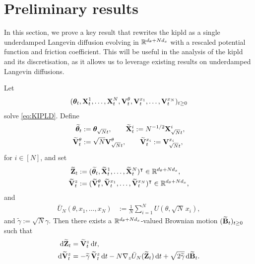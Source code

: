 \section{Preliminary results}

\setcounter{theorem}{0}
\renewcommand{\thetheorem}{A.\arabic{theorem}}
\setcounter{lemma}{0}
\renewcommand{\thelemma}{A.\arabic{lemma}}
\setcounter{proposition}{0}
\renewcommand{\theproposition}{A.\arabic{proposition}}
\setcounter{remark}{0}
\renewcommand{\theremark}{A.\arabic{remark}}

In this section, we prove a key result that rewrites the \gls*{kipld} as a single underdamped Langevin diffusion evolving in ${\mathbb R}^{d_\theta + N d_x}$ with a rescaled potential function and friction coefficient. This will be useful in the analysis of the \gls*{kipld} and its discretisation, as it allows us to leverage existing results on underdamped Langevin diffusions.
\begin{proposition}\label{prop:kipld_standard_ud}
Let $$(\bm{\theta}_t,{\mathbf X}_t^1,\ldots,{\mathbf X}_t^N,{\mathbf V}_t^\theta,{\mathbf V}_t^{x_1},\ldots,{\mathbf V}_t^{x_N})_{t\geq 0}$$ solve \eqref{eq:KIPLD}. Define
\begin{align*}
\widetilde{\bm{\theta}}_t &:= \bm{\theta}_{\sqrt{N}t}, \qquad
\widetilde{{\mathbf X}}_t^i := N^{-1/2}{\mathbf X}^i_{\sqrt{N}t}, \\
\widetilde{{\mathbf V}}_t^\theta &:= \sqrt{N}{\mathbf V}^\theta_{\sqrt{N}t}, \qquad
\widetilde{{\mathbf V}}_t^{x_i} := {\mathbf V}^{x_i}_{\sqrt{N}t},
\end{align*}
for $i\in[N]$, and set
\begin{align*}
\widetilde{{\mathbf Z}}_t &:= (\widetilde{\bm{\theta}}_t,\widetilde{{\mathbf X}}_t^1,\ldots,\widetilde{{\mathbf X}}_t^N)^\intercal \in {\mathbb R}^{d_\theta+Nd_x}, \\
\widetilde{{\mathbf V}}_t^z &:= (\widetilde{{\mathbf V}}_t^\theta,\widetilde{{\mathbf V}}_t^{x_1},\ldots,\widetilde{{\mathbf V}}_t^{x_N})^\intercal \in {\mathbb R}^{d_\theta+Nd_x},
\end{align*}
and
\begin{align}
\bar U_N(\theta,x_1,\ldots,x_N) &:= \frac{1}{N}\sum_{i=1}^N U(\theta,\sqrt{N}\,x_i), \label{eq:barU}
\end{align}
and $\widetilde{\gamma} := \sqrt{N}\gamma$. Then there exists a ${\mathbb R}^{d_\theta+Nd_x}$-valued Brownian motion $(\widetilde{{\mathbf B}}_t)_{t\ge 0}$ such that
\begin{align}
{\mathrm d} \widetilde{{\mathbf Z}}_t &= \widetilde{{\mathbf V}}_t^z\,{\mathrm d} t, \label{eq:simplesde_scaled} \\
{\mathrm d} \widetilde{{\mathbf V}}_t^z &= -\widetilde{\gamma}\,\widetilde{{\mathbf V}}_t^z\,{\mathrm d} t
- N\nabla_z \bar U_N(\widetilde{{\mathbf Z}}_t)\,{\mathrm d} t
+ \sqrt{2\widetilde{\gamma}}\,{\mathrm d} \widetilde{{\mathbf B}}_t. \nonumber
\end{align}
\end{proposition}

